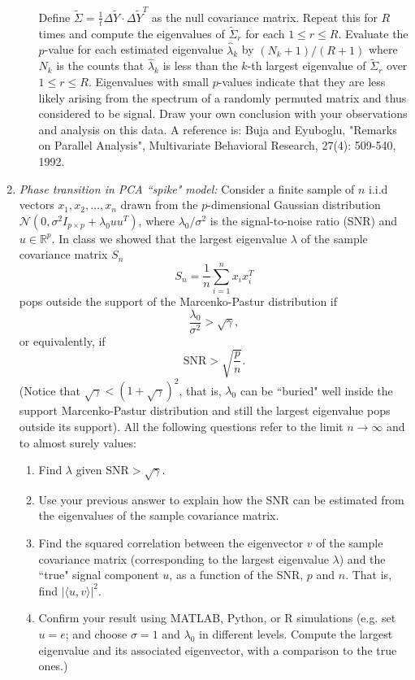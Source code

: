 \documentclass[11pt]{article}
\begin{document}
\begin{enumerate}
\begin{enumerate}
\[\]
Define $\tilde{\Sigma} = \frac{1}{t} \Delta \tilde{Y} \cdot \Delta \tilde{Y}^T$ as the null covariance matrix. Repeat this for $R$ times and compute the eigenvalues of $\tilde{\Sigma}_r$ for each $1\leq r\leq R$. Evaluate the $p$-value for each estimated eigenvalue $\hat{\lambda}_k$ by $(N_k + 1)/(R+1)$ where $N_k$ is the counts that $\hat{\lambda}_k$ is less than the $k$-th largest eigenvalue of $\tilde{\Sigma}_r$ over $1\leq r \leq R$. Eigenvalues with small $p$-values indicate that they are less likely arising from the spectrum of a randomly permuted matrix and thus considered to be signal. Draw your own conclusion with your observations and analysis on this data. A reference is: Buja and Eyuboglu, "Remarks on Parallel Analysis", Multivariate Behavioral Research, 27(4): 509-540, 1992.
\end{enumerate}


\item {\em Phase transition in PCA ``spike" model:} Consider a finite sample of $n$ i.i.d vectors $x_1,x_2,\ldots,x_n$ drawn from the $p$-dimensional Gaussian distribution $\mathcal{N}(0,\sigma^2 I_{p\times p} + \lambda_0 uu^T)$, where $\lambda_0/\sigma^2$ is the signal-to-noise ratio (SNR) and $u \in \mathbb{R}^p$. In class we showed that the largest eigenvalue $\lambda$ of the sample covariance matrix $S_n$
    $$S_n = \frac{1}{n} \sum_{i=1}^n x_i x_i^T$$
    pops outside the support of the Marcenko-Pastur distribution if $$\frac{\lambda_0}{\sigma^2} > \sqrt{\gamma},$$ or equivalently, if $$\text{SNR} > \sqrt{\frac{p}{n}}.$$ (Notice that $\sqrt{\gamma} < (1+\sqrt{\gamma})^2$, that is, $\lambda_0$ can be ``buried" well inside the support Marcenko-Pastur distribution and still the largest eigenvalue pops outside its support). All the following questions refer to the limit $n\to \infty$ and to almost surely values:

\begin{enumerate}
\item Find $\lambda$ given $\text{SNR} > \sqrt{\gamma}$.
\item Use your previous answer to explain how the SNR can be estimated from the eigenvalues of the sample covariance matrix.
\item Find the squared correlation between the eigenvector $v$ of the sample covariance matrix (corresponding to the largest eigenvalue $\lambda$) and the ``true" signal component $u$, as a function of the SNR, $p$ and $n$. That is, find $|\langle u,v \rangle|^2$. 
\item Confirm your result using MATLAB, Python, or R simulations (e.g. set $u = e$; and choose $\sigma=1$ and $\lambda_0$ in different levels. Compute the largest eigenvalue and its associated eigenvector, with a comparison to the true ones.)
\end{enumerate}



\end{enumerate}
\end{document}
